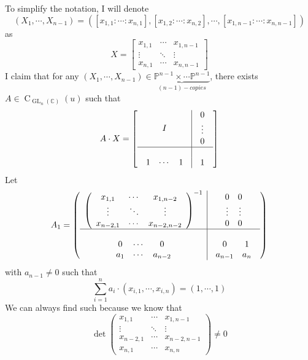 \begin{example}
To simplify the notation, I will denote 
\[
	(X_1,\cdots,X_{n-1})=([x_{1,1}:\cdots:x_{n,1}],[x_{1,2}:				\cdots:x_{n,2}],
	\cdots,
	[x_{1,n-1}:\cdots:x_{n,n-1}])\] as 
\[
	X
	=
	\begin{bmatrix}
		x_{1,1}&\cdots&x_{1,n-1}\\
		\vdots&\ddots&\vdots\\
		x_{n,1}&\cdots&x_{n,n-1}
	\end{bmatrix}
\]
I claim that for any $(X_1,\cdots,X_{n-1}) \in \underbrace{\mathbb{P}^{n-1}\times\cdots\mathbb{P}^{n-1}}_{(n-1)-copies}$, there exists $A\in \operatorname{C}_{\operatorname{GL}_n(\mathbb{C})}(u)$ such that 
\[
	A\cdot X=
	\left[
	\begin{array}{c|c}
		I
		&
		\begin{array}{c}
			0  \\
			\vdots \\
			0
		\end{array}\\
		\hline\\
		\begin{array}{ccc}
			1&\cdots&1
		\end{array}
		&
		1				 
	\end{array}	
	\right]
\]
Let
\[
	A_1=
	\left(\begin{array}{c|c}
		\left(\begin{array}{ccc}
			x_{1,1}&\cdots&x_{1,n-2}\\
			\vdots&\ddots&\vdots\\
			x_{n-2,1}&\cdots&x_{n-2,n-2}
		\end{array}\right)^{-1}
		&
		\begin{array}{cc}
			0&0\\
			\vdots&\vdots\\
			0&0
		\end{array}		
		\\
		\hline\\
		\begin{array}{ccc}
			0&\cdots&0\\
			a_1&\cdots&a_{n-2}
		\end{array}
		&
		\begin{array}{cc}
			0&1\\
			a_{n-1}&a_{n}
		\end{array}
	\end{array}\right)
\]
with $a_{n-1}\neq 0$ such that 
\[
\sum_{i=1}^{n} a_{i}\cdot (x_{i,1},\cdots,x_{i,n})=(1,\cdots,1)
\]
We can always find such because we know that
\[
		\operatorname{det}
		\left( \begin{array}{ccc}
			x_{1,1}&\cdots &x_{1,n-1}\\
			\vdots &\ddots & \vdots \\
			x_{n-2,1}&\cdots &x_{n-2,n-1}\\
			x_{n,1}&\cdots & x_{n,n}
		\end{array}\right)
		\neq 0
\]


\end{example}
